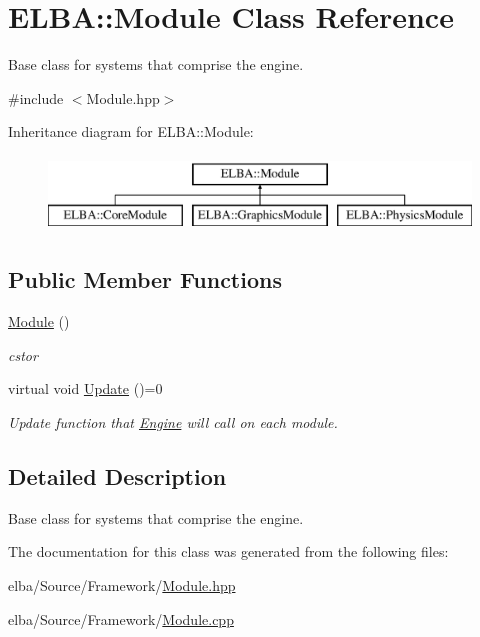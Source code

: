\hypertarget{class_e_l_b_a_1_1_module}{}\section{E\+L\+BA\+:\+:Module Class Reference}
\label{class_e_l_b_a_1_1_module}


Base class for systems that comprise the engine.  




{\ttfamily \#include $<$Module.\+hpp$>$}

Inheritance diagram for E\+L\+BA\+:\+:Module\+:\begin{figure}[H]
\begin{center}
\leavevmode
\includegraphics[height=2.000000cm]{class_e_l_b_a_1_1_module}
\end{center}
\end{figure}
\subsection*{Public Member Functions}
\begin{DoxyCompactItemize}
\item 
\mbox{\label{class_e_l_b_a_1_1_module_af35ca6b0cec41f471adff4145767927c}} 
\mbox{\hyperlink{class_e_l_b_a_1_1_module_af35ca6b0cec41f471adff4145767927c}{Module}} ()
\begin{DoxyCompactList}\small\item\em cstor \end{DoxyCompactList}\item 
\mbox{\label{class_e_l_b_a_1_1_module_a9f7461e29016c9b246c9888fe5534b85}} 
virtual void \mbox{\hyperlink{class_e_l_b_a_1_1_module_a9f7461e29016c9b246c9888fe5534b85}{Update}} ()=0
\begin{DoxyCompactList}\small\item\em Update function that \mbox{\hyperlink{class_e_l_b_a_1_1_engine}{Engine}} will call on each module. \end{DoxyCompactList}\end{DoxyCompactItemize}


\subsection{Detailed Description}
Base class for systems that comprise the engine. 

The documentation for this class was generated from the following files\+:\begin{DoxyCompactItemize}
\item 
elba/\+Source/\+Framework/\mbox{\hyperlink{_module_8hpp}{Module.\+hpp}}\item 
elba/\+Source/\+Framework/\mbox{\hyperlink{_module_8cpp}{Module.\+cpp}}\end{DoxyCompactItemize}
